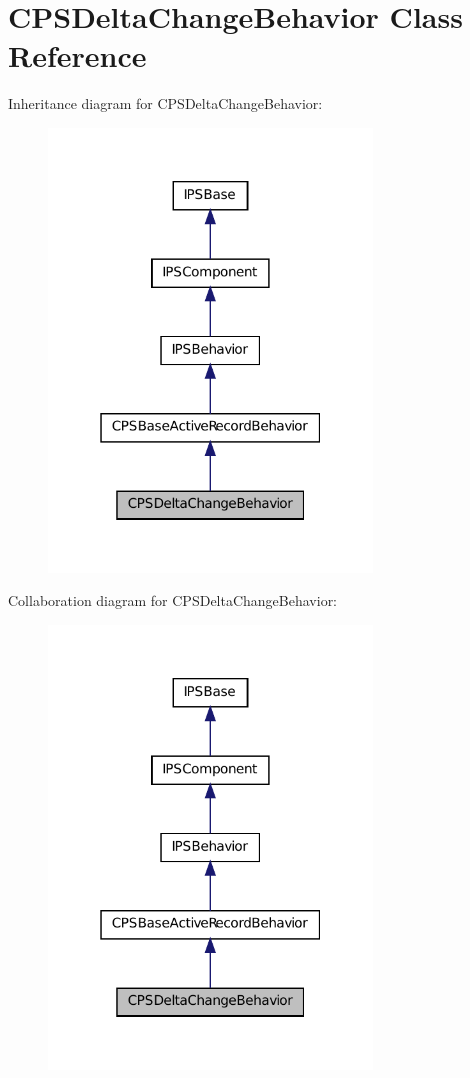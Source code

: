 \hypertarget{classCPSDeltaChangeBehavior}{
\section{CPSDeltaChangeBehavior Class Reference}
\label{classCPSDeltaChangeBehavior}
}


Inheritance diagram for CPSDeltaChangeBehavior:\nopagebreak
\begin{figure}[H]
\begin{center}
\leavevmode
\includegraphics[width=244pt]{classCPSDeltaChangeBehavior__inherit__graph}
\end{center}
\end{figure}


Collaboration diagram for CPSDeltaChangeBehavior:\nopagebreak
\begin{figure}[H]
\begin{center}
\leavevmode
\includegraphics[width=244pt]{classCPSDeltaChangeBehavior__coll__graph}
\end{center}
\end{figure}
